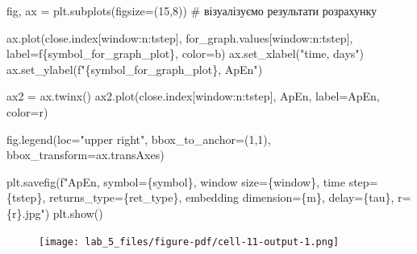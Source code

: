 \documentclass[
  letterpaper,
]{report}
\newenvironment{Shaded}{\begin{snugshade}}{\end{snugshade}}
\newcommand{\CommentTok}[1]{\textcolor[rgb]{0.37,0.37,0.37}{#1}}
\newcommand{\DecValTok}[1]{\textcolor[rgb]{0.68,0.00,0.00}{#1}}
\newcommand{\NormalTok}[1]{\textcolor[rgb]{0.00,0.23,0.31}{#1}}
\newcommand{\OperatorTok}[1]{\textcolor[rgb]{0.37,0.37,0.37}{#1}}
\newcommand{\SpecialCharTok}[1]{\textcolor[rgb]{0.37,0.37,0.37}{#1}}
\newcommand{\SpecialStringTok}[1]{\textcolor[rgb]{0.13,0.47,0.30}{#1}}
\newcommand{\StringTok}[1]{\textcolor[rgb]{0.13,0.47,0.30}{#1}}
\begin{document}
\begin{Shaded}
\begin{Highlighting}[]
\NormalTok{fig, ax }\OperatorTok{=}\NormalTok{ plt.subplots(figsize}\OperatorTok{=}\NormalTok{(}\DecValTok{15}\NormalTok{,}\DecValTok{8}\NormalTok{)) }\CommentTok{\# візуалізуємо результати розрахунку}

\NormalTok{ax.plot(close.index[window:n:tstep], for\_graph.values[window:n:tstep], label}\OperatorTok{=}\SpecialStringTok{f\textquotesingle{}}\SpecialCharTok{\{}\NormalTok{symbol\_for\_graph\_plot}\SpecialCharTok{\}}\SpecialStringTok{\textquotesingle{}}\NormalTok{, color}\OperatorTok{=}\StringTok{\textquotesingle{}b\textquotesingle{}}\NormalTok{)}
\NormalTok{ax.set\_xlabel(}\StringTok{"time, days"}\NormalTok{)}
\NormalTok{ax.set\_ylabel(}\SpecialStringTok{f"}\SpecialCharTok{\{}\NormalTok{symbol\_for\_graph\_plot}\SpecialCharTok{\}}\SpecialStringTok{, ApEn"}\NormalTok{)}

\NormalTok{ax2 }\OperatorTok{=}\NormalTok{ ax.twinx()}
\NormalTok{ax2.plot(close.index[window:n:tstep], ApEn, label}\OperatorTok{=}\StringTok{\textquotesingle{}ApEn\textquotesingle{}}\NormalTok{, color}\OperatorTok{=}\StringTok{\textquotesingle{}r\textquotesingle{}}\NormalTok{)}

\NormalTok{fig.legend(loc}\OperatorTok{=}\StringTok{"upper right"}\NormalTok{, bbox\_to\_anchor}\OperatorTok{=}\NormalTok{(}\DecValTok{1}\NormalTok{,}\DecValTok{1}\NormalTok{), bbox\_transform}\OperatorTok{=}\NormalTok{ax.transAxes)}

\NormalTok{plt.savefig(}\SpecialStringTok{f"ApEn, symbol=}\SpecialCharTok{\{}\NormalTok{symbol}\SpecialCharTok{\}}\SpecialStringTok{, window size=}\SpecialCharTok{\{}\NormalTok{window}\SpecialCharTok{\}}\SpecialStringTok{, time step=}\SpecialCharTok{\{}\NormalTok{tstep}\SpecialCharTok{\}}\SpecialStringTok{, returns\_type=}\SpecialCharTok{\{}\NormalTok{ret\_type}\SpecialCharTok{\}}\SpecialStringTok{, embedding dimension=}\SpecialCharTok{\{}\NormalTok{m}\SpecialCharTok{\}}\SpecialStringTok{, delay=}\SpecialCharTok{\{}\NormalTok{tau}\SpecialCharTok{\}}\SpecialStringTok{, r=}\SpecialCharTok{\{}\NormalTok{r}\SpecialCharTok{\}}\SpecialStringTok{.jpg"}\NormalTok{)}
\NormalTok{plt.show()}
\end{Highlighting}
\end{Shaded}

\begin{figure}[H]

{\centering \texttt{[image: lab\_5\_files/figure-pdf/cell-11-output-1.png]}

}

\end{figure}
\end{document}
